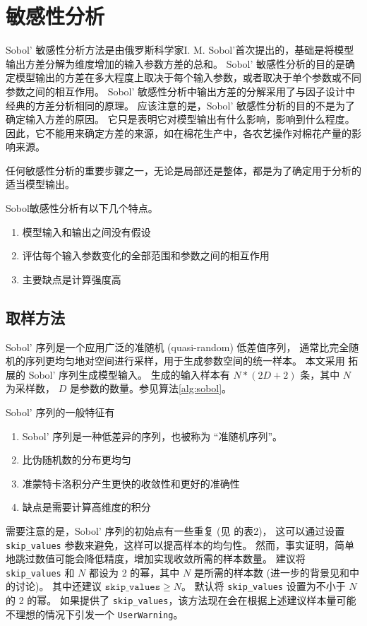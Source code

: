 \section{敏感性分析}
Sobol' 敏感性分析方法是由俄罗斯科学家I. M. Sobol'首次提出的\cite{sobol2001}，基础是将模型输出方差分解为维度增加的输入参数方差的总和。
Sobol' 敏感性分析的目的是确定模型输出的方差在多大程度上取决于每个输入参数，或者取决于单个参数或不同参数之间的相互作用。%
Sobol' 敏感性分析中输出方差的分解采用了与因子设计中经典的方差分析相同的原理。%
应该注意的是，Sobol' 敏感性分析的目的不是为了确定输入方差的原因。%
它只是表明它对模型输出有什么影响，影响到什么程度。%
因此，它不能用来确定方差的来源，如在棉花生产中，各农艺操作对棉花产量的影响来源。

任何敏感性分析的重要步骤之一，无论是局部还是整体，都是为了确定用于分析的适当模型输出。

Sobol敏感性分析有以下几个特点。
\begin{enumerate}
    \item 模型输入和输出之间没有假设
    \item 评估每个输入参数变化的全部范围和参数之间的相互作用
    \item 主要缺点是计算强度高
\end{enumerate}
\subsection{取样方法}
Sobol' 序列是一个应用广泛的准随机 (quasi-random) 低差值序列，%
通常比完全随机的序列更均匀地对空间进行采样，用于生成参数空间的统一样本。%
本文采用  拓展的 Sobol' 序列生成模型输入。%
生成的输入样本有 $N * (2D + 2)$ 条，其中 $N$ 为采样数， $D$ 是参数的数量。参见算法\ref{alg:sobol}。

Sobol' 序列的一般特征有
\begin{enumerate}
    \item Sobol' 序列是一种低差异的序列，也被称为 “准随机序列”。
    \item 比伪随机数的分布更均匀
    \item 准蒙特卡洛积分产生更快的收敛性和更好的准确性
    \item 缺点是需要计算高维度的积分
\end{enumerate}

需要注意的是，Sobol' 序列的初始点有一些重复 (见 的表2)，%
这可以通过设置 \texttt{skip\_values} 参数来避免，这样可以提高样本的均匀性。%
然而，事实证明，简单地跳过数值可能会降低精度，增加实现收敛所需的样本数量\cite{owen2021}。
建议将 \texttt{skip\_values} 和 $N$ 都设为 2 的幂，其中 $N$ 是所需的样本数 (进一步的背景见和中的讨论)。%
其中还建议 $\mathtt{skip\_values} \ge N$。%
默认将 \texttt{skip\_values} 设置为不小于 $N$ 的 2 的幂。%
如果提供了 \texttt{skip\_values}，该方法现在会在根据上述建议样本量可能不理想的情况下引发一个 \texttt{UserWarning}。

